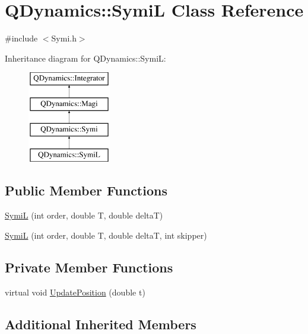 \hypertarget{classQDynamics_1_1SymiL}{}\section{Q\+Dynamics\+:\+:SymiL Class Reference}
\label{classQDynamics_1_1SymiL}


{\ttfamily \#include $<$Symi.\+h$>$}

Inheritance diagram for Q\+Dynamics\+:\+:SymiL\+:\begin{figure}[H]
\begin{center}
\leavevmode
\includegraphics[height=4.000000cm]{classQDynamics_1_1SymiL}
\end{center}
\end{figure}
\subsection*{Public Member Functions}
\begin{DoxyCompactItemize}
\item 
\hyperlink{classQDynamics_1_1SymiL_ac220b2a8cccf6c3c8ca0d0f79c094fe7}{SymiL} (int order, double T, double deltaT)
\item 
\hyperlink{classQDynamics_1_1SymiL_acdb13fb6bc527f687385dbdb05ff6e17}{SymiL} (int order, double T, double deltaT, int skipper)
\end{DoxyCompactItemize}
\subsection*{Private Member Functions}
\begin{DoxyCompactItemize}
\item 
virtual void \hyperlink{classQDynamics_1_1SymiL_a28d23793abeb8f40c9d9ec069d67debb}{Update\+Position} (double t)
\end{DoxyCompactItemize}
\subsection*{Additional Inherited Members}


